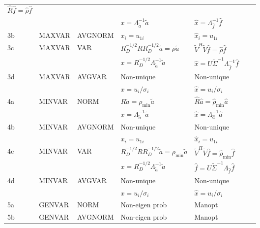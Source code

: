 \begin{table*}[!h]
\begin{tabular}{lllllll}
    $\widehat{R} \widehat{f}=\widehat{\rho} \widehat{f}$&
    \cite{nielsen1994analysis}\\ 
    &&&$x=\Lambda_{\tilde{a}}^{-1}\tilde{a}$&
    $\widehat{x}=\Lambda_{\widehat{f}}^{-1}\widehat{f}$ &\\ 
    3b & MAXVAR & AVGNORM & $x_i=u_{1i}$ &
    $\widehat{x}_i = u_{1i}$ &
    \cite{nielsen1994analysis}\\ 
    3c & MAXVAR & VAR &
    $R_D^{-1/2}RR_D^{-1/2}\tilde{a}=\rho\tilde{a}$&
    $\tilde{V}^H\tilde{V}\widehat{f}=\widehat{\rho}\widehat{f}$&
    \cite{kettenring1971canonical,nielsen1994analysis}\\ 
    &&&$x=R_D^{-1/2}\Lambda_{\widetilde{a}}^{-1}\widetilde{a}$&
    $\widehat{x}=U\widetilde{\Sigma}^{-1}\Lambda_{\widehat{f}}^{-1}\widehat{f}$&\\ 
    3d & MAXVAR & AVGVAR &
    Non-unique &
    Non-unique &
    \cite{deleus2011functional,via2005canonical,nielsen1994analysis}\\ 
    &&& $x=u_i/\sigma_i$ & $\widehat{x} = u_i/\sigma_i$&\\  
    \midrule
    4a & MINVAR & NORM & $R\tilde{a} = \rho_{\text{min}}\tilde{a}$ &
    $\widehat{R}\widehat{a}=\widehat{\rho}_{\text{min}}\widehat{a}$&  
    \cite{nielsen1994analysis}\\ 
    &&&$x=\Lambda_{\widetilde{a}}^{-1}\widetilde{a}$&
    $\widehat{x}=\Lambda_{\widehat{a}}^{-1}\widehat{a}$ &\\  
    4b & MINVAR & AVGNORM & Non-unique & Non-unique & 
    \cite{nielsen1994analysis}\\ 
    &&& $x_i = u_{1i}$ & $\widehat{x}_i = u_{1i}$&\\
    4c & MINVAR & VAR &
    $R_D^{-1/2}RR_D^{-1/2}\widetilde{a}=\rho_{\text{min}}\widetilde{a}$&
    $\widetilde{V}^H\widetilde{V}\widehat{f}=\widehat{\rho}_{\text{min}} \widehat{f}$&
    \cite{kettenring1971canonical,nielsen1994analysis}\\ 
    &&&$x=R_D^{-1/2}\Lambda_{\widetilde{a}}^{-1}\widetilde{a}$&
    $\widehat{f}=U\widetilde{\Sigma}^{-1}\Lambda_{\widehat{f}}\widehat{f}$& \\
    4d & MINVAR & AVGVAR & Non-unique & Non-unique&
    \cite{nielsen1994analysis,bach2003kernel}\\ 
    &&& $x=u_{i}/\sigma_i$ & $\widehat{x} = u_i/\sigma_i $&\\  
    \midrule
    5a & GENVAR & NORM & Non-eigen prob & Manopt&  \cite{nielsen1994analysis}\\
    5b & GENVAR & AVGNORM & Non-eigen prob & Manopt&  \cite{nielsen1994analysis}\\

\end{tabular}
\end{table*}
